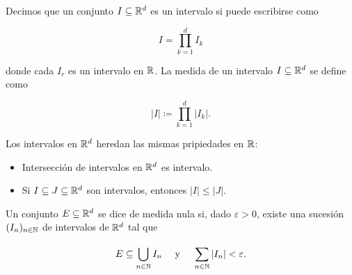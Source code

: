 	\begin{definition}
		Decimos que un conjunto $I\subseteq\mathbb{R}^d$ es un intervalo si puede escribirse como

		\[
		I=\prod_{k=1}^{d} I_k
		\]

		donde cada $I_r$ es un intervalo en $\mathbb{R}$. La medida de un intervalo $I\subseteq\mathbb{R}^d$ se define como
		
		\[
		|I|\coloneq\prod_{k=1}^{d} |I_k|.
		\]
	\end{definition}

	\begin{note}
		Los intervalos en $\mathbb{R}^d$ heredan las mismas pripiedades en $\mathbb{R}$:

		\begin{itemize}
			\item Intersección de intervalos en $\mathbb{R}^d$ es intervalo.

			\item Si $I\subseteq J\subseteq\mathbb{R}^d$ son intervalos, entonces $|I|\leq|J|$.
		\end{itemize}
	\end{note}

	\begin{definition}
		Un conjunto $E\subseteq\mathbb{R}^d$ se dice de medida nula si, dado $\varepsilon>0$, existe una sucesión $(I_n)_{n\in\mathbb{N}}$ de intervalos de $\mathbb{R}^d$ tal que

		\[
		E\subseteq\bigcup_{n\in\mathbb{N}} I_n\quad\text{ y }\quad \sum_{n\in\mathbb{N}}^{}|I_n|<\varepsilon.
		\]
	\end{definition}

